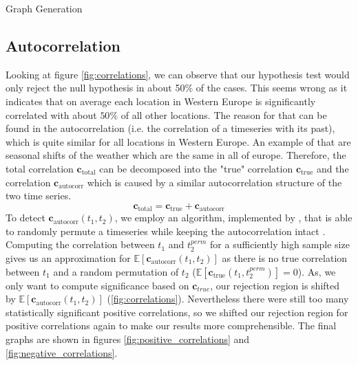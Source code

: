 \documentclass[12pt]{article}
\begin{document}
\begin{section}{Graph Generation}
\subsection{Autocorrelation}
Looking at figure \ref{fig:correlations}, we can observe that our hypothesis test would only reject the null hypothesis in about 50$\%$ of the cases. This seems wrong as it indicates that on average each location in Western Europe is significantly correlated with about $50\%$ of all other locations.
The reason for that can be found in the autocorrelation (i.e. the correlation of a timeseries with its past), which is quite similar for all locations in Western Europe. 
An example of that are seasonal shifts of the weather which are the same in all of europe.
Therefore, the total correlation $\textbf{c}_\text{total}$ can be decomposed into the "true" correlation
 $\textbf{c}_\text{true}$ and the correlation $\textbf{c}_\text{autocorr}$ which is caused by a similar autocorrelation structure of the two time series. 
\begin{equation}
    \textbf{c}_\text{total} = \textbf{c}_\text{true} + \textbf{c}_\text{autocorr}
\end{equation}
To detect $\textbf{c}_\text{autocorr}(t_1,t_2)$, we employ an algorithm, implemented by \citeauthor{rand_perm_alg}, that is able to randomly permute a timeseries while keeping the autocorrelation intact \citep{rand_perm}.
Computing the correlation between $t_1$ and $t_2^{perm}$ for a sufficiently high sample size gives us an approximation for $\mathbb{E}[\textbf{c}_\text{autocorr}(t_1, t_2)]$ as there is no true correlation between $t_1$ and a random permutation of $t_2$ ($\mathbb{E}[\textbf{c}_\text{true}(t_1,t_2^{perm})] = 0$).
As, we only want to compute significance based on $\textbf{c}_{true}$, our rejection region is shifted by $\mathbb{E}[\textbf{c}_\text{autocorr}(t_1, t_2)]$ (\ref{fig:correlations}).
Nevertheless there were still too many statistically significant positive correlations, so we shifted our rejection region for positive correlations again to make our results more comprehensible. 
The final graphs are shown in figures \ref{fig:positive_correlations} and \ref{fig:negative_correlations}.

\end{section}
\end{document}
